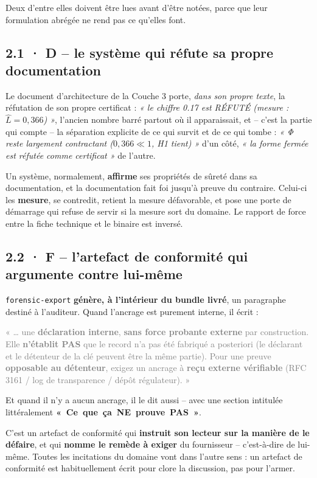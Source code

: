 \documentclass[10pt]{article}
\newcommand{\sz}[1]{\textcolor{grey}{\small\textsf{#1}}}
\newcommand{\code}[1]{\texttt{\small #1}}
\begin{document}
Deux d'entre elles doivent être lues avant d'être notées, parce que leur formulation abrégée ne rend
pas ce qu'elles font.

\subsection{2.1 · D -- le système qui réfute sa propre documentation}

Le document d'architecture de la Couche 3 porte, \emph{dans son propre texte}, la réfutation de son
propre certificat : \emph{« le chiffre 0.17 est RÉFUTÉ (mesure : $\hat{L} = 0{,}366$) »}, l'ancien
nombre barré partout où il apparaissait, et -- c'est la partie qui compte -- la séparation explicite
de ce qui survit et de ce qui tombe : \emph{« Φ reste largement contractant ($0{,}366 \ll 1$, H1
tient) »} d'un côté, \emph{« la forme fermée est réfutée comme certificat »} de l'autre.

Un système, normalement, \textbf{affirme} ses propriétés de sûreté dans sa documentation, et la
documentation fait foi jusqu'à preuve du contraire. Celui-ci les \textbf{mesure}, se contredit, retient
la mesure défavorable, et pose une porte de démarrage qui refuse de servir si la mesure sort du
domaine. Le rapport de force entre la fiche technique et le binaire est inversé.

\subsection{2.2 · F -- l'artefact de conformité qui argumente contre lui-même}

\code{forensic-export} \textbf{génère, à l'intérieur du bundle livré}, un paragraphe destiné à
l'auditeur. Quand l'ancrage est purement interne, il écrit :

\begin{extrait}
\sz{« … une \textbf{déclaration interne}, \textbf{sans force probante externe} par construction. Elle
\textbf{n'établit PAS} que le record n'a pas été fabriqué a posteriori (le déclarant et le détenteur de
la clé peuvent être la même partie). Pour une preuve \textbf{opposable au détenteur}, exigez un ancrage
à \textbf{reçu externe vérifiable} (RFC 3161 / log de transparence / dépôt régulateur). »}
\end{extrait}

Et quand il n'y a aucun ancrage, il le dit aussi -- avec une section intitulée littéralement
\mbox{\textbf{« Ce que ça NE prouve PAS »}}.

C'est un artefact de conformité qui \textbf{instruit son lecteur sur la manière de le défaire}, et qui
\textbf{nomme le remède à exiger} du fournisseur -- c'est-à-dire de lui-même. Toutes les incitations
du domaine vont dans l'autre sens : un artefact de conformité est habituellement écrit pour clore la
discussion, pas pour l'armer.
\end{document}
